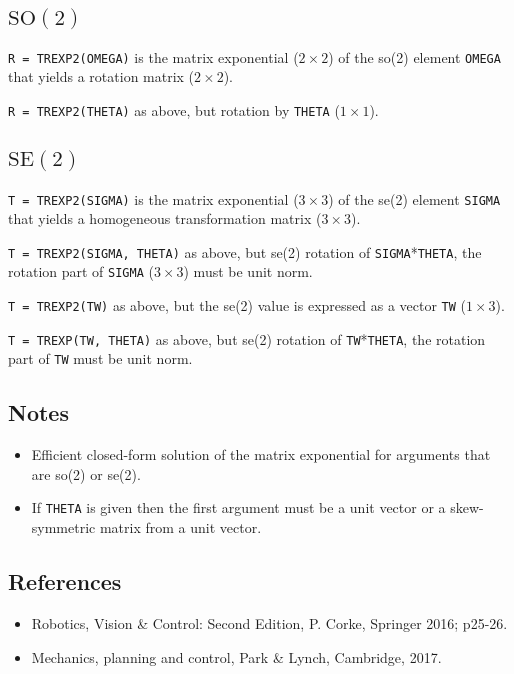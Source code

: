 \subsection*{$\mbox{SO}(2)$}


\texttt{R = TREXP2(OMEGA)} is the matrix exponential ($2 \times 2$) of the so(2) element \texttt{OMEGA} that
yields a rotation matrix ($2 \times 2$).



\texttt{R = TREXP2(THETA)} as above, but rotation by \texttt{THETA} ($1 \times 1$).


\subsection*{$\mbox{SE}(2)$}


\texttt{T = TREXP2(SIGMA)} is the matrix exponential ($3 \times 3$) of the se(2) element
\texttt{SIGMA} that yields a homogeneous transformation  matrix ($3 \times 3$).



\texttt{T = TREXP2(SIGMA, THETA)} as above, but se(2) rotation of \texttt{SIGMA}*\texttt{THETA}, the
rotation part of \texttt{SIGMA} ($3 \times 3$) must be unit norm.



\texttt{T = TREXP2(TW)} as above, but the se(2) value is expressed as a vector \texttt{TW}
($1 \times 3$).



\texttt{T = TREXP(TW, THETA)} as above, but se(2) rotation of \texttt{TW}*\texttt{THETA}, the
rotation part of \texttt{TW} must be unit norm.


\subsection*{Notes}
\begin{itemize}
  \item Efficient closed-form solution of the matrix exponential for arguments that are    so(2) or se(2).
  \item If \texttt{THETA} is given then the first argument must be a unit vector or a    skew-symmetric matrix from a unit vector.
\end{itemize}

\subsection*{References}
\begin{itemize}
  \item Robotics, Vision \& Control: Second Edition, P. Corke, Springer 2016; p25-26.
  \item Mechanics, planning and control, Park \& Lynch, Cambridge, 2017.
\end{itemize}

